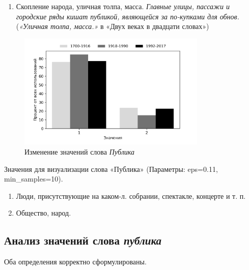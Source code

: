 \begin{enumerate}
    \item Скопление народа, уличная толпа, масса. \textit{Главные улицы, пассажи и городские ряды кишат публикой, являющейся за по-купками для обнов.}
(\textit{«Уличная толпа, масса.»} в «Двух веках в двадцати словах»)

\end{enumerate}

\begin{figure}[H]
	\centering
	\includegraphics[width=0.8\textwidth]{img/visualizations/publika_minimal}
	\caption{Изменение значений слова \textit{Публика}}
	\label{fig:Публика}
\end{figure}

Значения для визуализации слова «Публика» (Параметры: eps=0.11, min\_samples=10).

\begin{enumerate}
    \item Люди, присутствующие на каком-л. собрании, спектакле, концерте и т. п.
    \item Общество, народ.
\end{enumerate}

\subsection*{Анализ значений слова \textit{публика}}

Оба определения корректно сформулированы.

